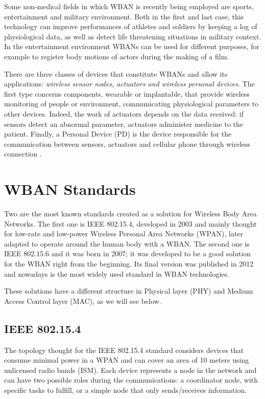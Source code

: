 \documentclass[conference]{IEEEtran}
\begin{document}
Some non-medical fields in which WBAN is recently being employed are sports, entertainment and military environment. Both in the first and last case, this technology can improve performances of athletes and soldiers by keeping a log of physiological data, as well as detect life threatening situations in military context. In the entertainment environment WBANs can be used for different purposes, for example to register body motions of actors during the making of a film.

There are three classes of devices that constitute WBANs and allow its applications: \textit{wireless sensor nodes, actuators and wireless personal devices}. The first type concerns components, wearable or implantable, that provide wireless monitoring of people or environment, communicating physiological parameters to other devices. Indeed, the work of actuators depends on the data received: if sensors detect an abnormal parameter, actuators administer medicine to the patient. Finally, a Personal Device (PD) is the device responsible for the communication between sensors, actuators and cellular phone through wireless connection \cite{salayma2017wireless}.


\section{WBAN Standards}
Two are the most known standards created as a solution for Wireless Body Area Networks. The first one is IEEE 802.15.4, developed in 2003 and mainly thought for low-rate and low-power Wireless Personal Area Networks (WPAN), later adapted to operate around the human body with a WBAN. The second one is IEEE 802.15.6 and it was born in 2007; it was developed to be a good solution for the WBAN right from the beginning. Its final version was published in 2012 and nowadays is the most widely used standard in WBAN technologies.

These solutions have a different structure in Physical layer (PHY) and Medium Access Control layer (MAC), as we will see below.


\subsection{IEEE 802.15.4}
The topology thought for the IEEE 802.15.4 standard considers devices that consume minimal power in a WPAN and can cover an area of 10 meters using unlicensed radio bands (ISM). Each device represents a node in the network and can have two possible roles during the communications: a coordinator node, with specific tasks to fulfill, or a simple node that only sends/receives information.
\end{document}
